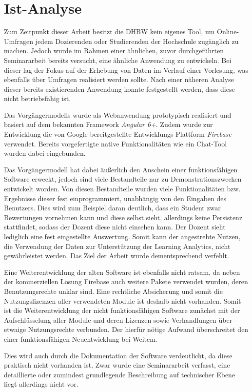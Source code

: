 \section{Ist-Analyse}
\label{sec:IstAnalyse}

Zum Zeitpunkt dieser Arbeit besitzt die \acs{DHBW} kein eigenes Tool, um Online-Umfragen jedem Dozierenden oder Studierenden der Hochschule zugänglich zu machen.
Jedoch wurde im Rahmen einer ähnlichen, zuvor durchgeführten Seminararbeit bereits versucht, eine ähnliche Anwendung zu entwickeln.
Bei dieser lag der Fokus auf der Erhebung von Daten im Verlauf einer Vorlesung, was ebenfalls über Umfragen realisiert werden sollte.
Nach einer näheren Analyse dieser bereits existierenden Anwendung konnte festgestellt werden, dass diese nicht betriebsfähig ist.

Das Vorgängermodells wurde als Webanwendung prototypisch realisiert und basiert auf dem bekannten Framework \emph{Angular 6+}.
Zudem wurde zur Entwicklung die von Google bereitgestellte Entwicklungs-Plattform \emph{Firebase} verwendet.
Bereits vorgefertigte native Funktionalitäten wie ein Chat-Tool wurden dabei eingebunden.

Das Vorgängermodell hat dabei äußerlich den Anschein einer funktionsfähigen Software erweckt, jedoch sind viele Bestandteile nur zu Demonstrationszwecken entwickelt worden.
Von diesen Bestandteile wurden viele Funktionalitäten bzw. Ergebnisse dieser fest einprogrammiert, unabhängig von den Eingaben des Benutzers.
Dies wird zum Beispiel daran deutlich, dass ein Student zwar Bewertungen vornehmen kann und diese selbst sieht, allerdings keine Persistenz stattfindet, sodass der Dozent diese nicht einsehen kann.
Der Dozent sieht lediglich eine fest eingestellte Auswertung.
Somit kann der angestrebte Nutzen, die Verwendung der Daten zur Unterstützung der Learning Analytics, nicht gewährleistet werden.
Das Ziel der Arbeit wurde dementsprechend verfehlt.

Eine Weiterentwicklung der alten Software ist ebenfalls nicht ratsam, da neben der kommerziellen Lösung Firebase auch weitere Pakete verwendet wurden, deren Benutzungsrechte unklar sind.
Eine rechtliche Absicherung und somit die Nutzungslizenzen aller verwendeten Module ist deshalb nicht vorhanden.
Somit ist die Weiterentwicklung der nicht funktionsfähigen Software zunächst mit der Aufschlüsselung aller Module und deren Lizenzen sowie Verhandlungen über etwaige Nutzungsrechte verbunden.
Der hierfür nötige Aufwand überschreitet den einer funktionsfähigen Neuentwicklung bei Weitem.

Dies wird auch durch die Dokumentation der Software verdeutlicht, da diese praktisch nicht vorhanden ist.
Zwar wurde eine Seminararbeit verfasst, eine detaillierte oder zumindest grundlegende Beschreibung auf technischer Ebene liegt allerdings nicht vor.
